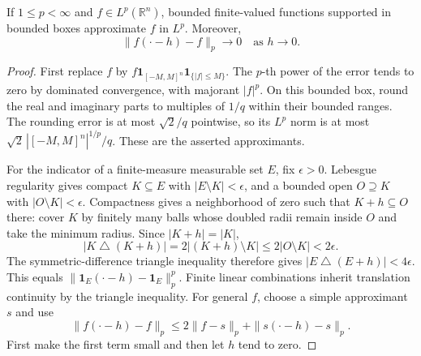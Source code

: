 \documentclass[11pt]{article}
\theoremstyle{definition}
\newcommand{\one}{\mathbf 1}
\newcommand{\R}{\mathbb R}
\begin{document}
\begin{lemma}\label{new:translation-continuity}
If $1\leq p<\infty$ and $f\in L^p(\R^n)$, bounded finite-valued functions supported in bounded
boxes approximate $f$ in $L^p$. Moreover,
\[
 \|f(\cdot-h)-f\|_p\longrightarrow0\quad\text{as }h\longrightarrow0.
\]
\end{lemma}
\begin{proof}
First replace $f$ by $f\one_{[-M,M]^n}\one_{\{|f|\leq M\}}$. The $p$-th power of the
error tends to zero by dominated convergence, with majorant $|f|^p$. On this bounded box,
round the real and imaginary parts to multiples of $1/q$ within their bounded ranges.
The rounding error is at most $\sqrt2/q$ pointwise, so its $L^p$ norm is at most
$\sqrt2\,|[-M,M]^n|^{1/p}/q$. These are the asserted approximants.

For the indicator of a finite-measure measurable set $E$, fix $\epsilon>0$. Lebesgue
regularity gives compact $K\subseteq E$ with $|E\setminus K|<\epsilon$, and a bounded open
$O\supseteq K$ with $|O\setminus K|<\epsilon$. Compactness gives a neighborhood of zero
such that $K+h\subseteq O$ there: cover $K$ by finitely many balls whose doubled radii
remain inside $O$ and take the minimum radius. Since $|K+h|=|K|$,
\[
 |K\mathbin\triangle(K+h)|=2|(K+h)\setminus K|\leq2|O\setminus K|<2\epsilon.
\]
The symmetric-difference triangle inequality therefore gives
$|E\mathbin\triangle(E+h)|<4\epsilon$. This equals
$\|\one_E(\cdot-h)-\one_E\|_p^p$. Finite linear combinations inherit translation continuity
by the triangle inequality. For general $f$, choose a simple approximant $s$ and use
\[
 \|f(\cdot-h)-f\|_p\leq2\|f-s\|_p+\|s(\cdot-h)-s\|_p.
\]
First make the first term small and then let $h$ tend to zero.
\end{proof}
\end{document}
